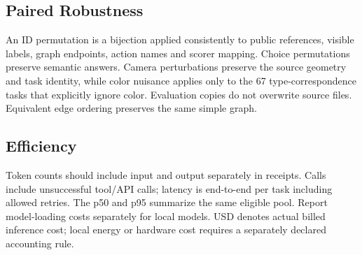 \documentclass[10pt,letterpaper]{article}
\begin{document}
\begin{table}[h]
\centering\small
\caption{Unrun ablations. Acc.\ and Valid are percentages; Calls is
mean tool calls across eligible tasks. The public solver's separately
verified goal success does not fill unmeasured resource-log cells.}

\end{table}

\subsection{Paired Robustness}
An ID permutation is a bijection applied consistently to public
references, visible labels, graph endpoints, action names and scorer
mapping. Choice permutations preserve semantic answers. Camera
perturbations preserve the source geometry and task identity, while
color nuisance applies only to the 67 type-correspondence tasks that
explicitly ignore color. Evaluation copies do not overwrite source
files. Equivalent edge ordering preserves the same simple graph.

\begin{table}[h]
\centering\small
\caption{Unrun paired robustness. Base and Changed are exact success
(\%); Consist.\ is mapped-output agreement (\%). Agreement alone can
include two wrong answers, so correct paired agreement must also be
retained in run receipts. Pool sizes are known; scores are unmeasured.}

\end{table}

\subsection{Efficiency}
Token counts should include input and output separately in receipts.
Calls include unsuccessful tool/API calls; latency is end-to-end
per task including allowed retries. The p50 and p95 summarize the same
eligible pool. Report model-loading costs separately for local models.
USD denotes actual billed inference cost; local energy or hardware cost
requires a separately declared accounting rule.

\begin{table}[h]
\centering\small
\caption{Unrun resource measurements. Tokens, Calls and USD are means
per eligible task; latency quantiles are seconds. Unbilled or untracked
quantities must not be filled with an assumed zero.}

\end{table}

\clearpage
\end{document}
